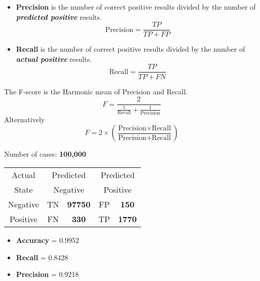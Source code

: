 \documentclass{article}
\begin{document}

	\begin{itemize}
		\item \textbf{Precision} is the number of correct positive results divided by the number of \textit{\textbf{predicted positive}} results.
		\[ \mbox{Precision}= \frac{TP}{TP+FP}  \]
		\item \textbf{Recall} is the number of correct positive results divided by the number of \textit{\textbf{actual positive}} results. 
		\[ \mbox{Recall}= \frac{TP}{TP+FN}  \]
	\end{itemize}
	
 The F-score is the Harmonic mean of Precision and Recall.
	\[ F = \frac{2}{\frac{1}{\mbox{Recall}} + \frac{1}{\mbox{Precision}}} \]
	Alternatively
	\[ F = 2 \times \left( \frac{\mbox{Precision} \times \mbox{Recall}}{\mbox{Precision} + \mbox{Recall}} \right) \] 
	
	
	
	

	Number of cases: \textbf{100,000}\\ 
	\begin{center}
		
		\begin{table}[!htbp]
			\begin{tabular}{c *4c}
				\toprule
				Actual &  \multicolumn{2}{c}{Predicted} & \multicolumn{2}{c}{Predicted}\\
				State &  \multicolumn{2}{c}{Negative} & \multicolumn{2}{c}{Positive}\\
				\midrule
				Negative   & \phantom{spa} TN & \textbf{97750}\phantom{spa}   & FP  & \textbf{150}\\
				Positive   & \phantom{spa} FN & \textbf{330} \phantom{spa}   & TP  & \textbf{1770}\\
				
				\bottomrule
			\end{tabular}
		\end{table}
	\end{center}
	\begin{itemize}
		\item \textbf{Accuracy} = 0.9952
		\item \textbf{Recall} = 0.8428
		\item \textbf{Precision} = 0.9218
	\end{itemize}
	
\end{document}
